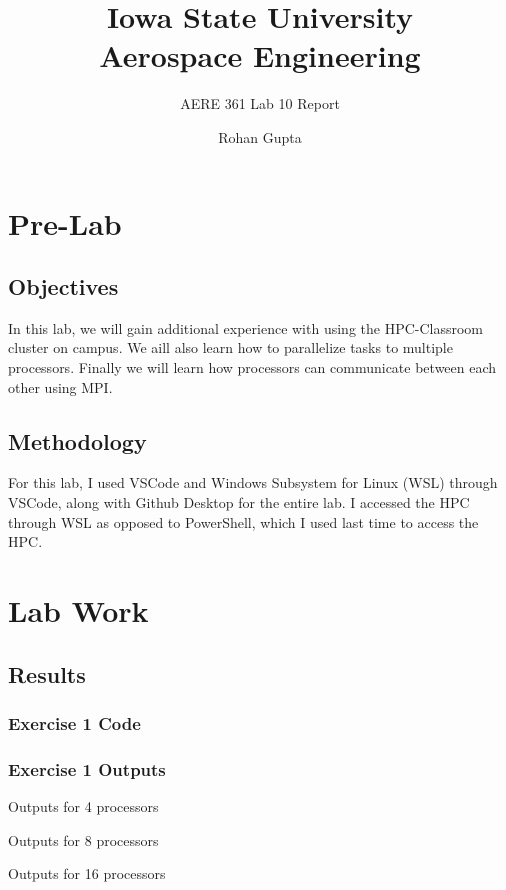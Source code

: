 \documentclass{report}
\title{\textbf{Iowa State University
\\{\Large Aerospace Engineering}}}
\subtitle{AERE 361 Lab 10 Report}
\author{Rohan Gupta}
\begin{document}
\maketitle
\tableofcontents
\chapter{Pre-Lab}
\section{Objectives}
In this lab, we will gain additional experience with using the HPC-Classroom cluster on campus. We aill also learn how to parallelize tasks to multiple processors. Finally we will learn how processors can communicate between each other using MPI.

\section{Methodology}
For this lab, I used VSCode and Windows Subsystem for Linux (WSL) through VSCode, along with Github Desktop for the entire lab. I accessed the HPC through WSL as opposed to PowerShell, which I used last time to access the HPC.


\chapter{Lab Work}
\section{Results}
\subsection{Exercise 1 Code}


\subsection{Exercise 1 Outputs}
Outputs for 4 processors


Outputs for 8 processors


Outputs for 16 processors


\end{document}
